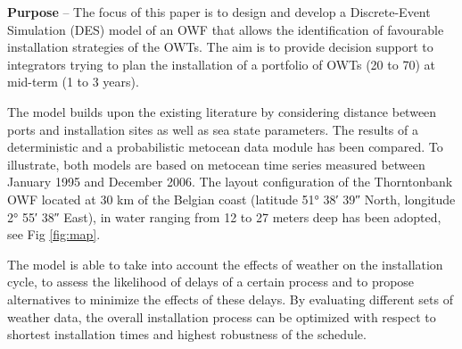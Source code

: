 \textbf{Purpose} --
The focus of this paper is to design and develop a Discrete-Event Simulation (DES) model of an OWF that allows the identification of favourable installation strategies of the OWTs. The aim is to provide decision support to integrators trying to plan the installation of a portfolio of OWTs (20 to 70) at mid-term (1 to 3 years).


The model builds upon the existing literature by considering distance between ports and installation sites as well as sea state parameters. The results of a deterministic and a probabilistic metocean data module has been compared. To illustrate, both models are based on metocean time series measured between January 1995 and December 2006. The layout configuration of the Thorntonbank OWF located at 30 km of the Belgian coast (latitude 51° 38′ 39″ North, longitude 2° 55′ 38″ East), in water ranging from 12 to 27 meters deep has been adopted, see Fig \ref{fig:map}.

The model is able to take into account the effects of weather on the installation cycle, to assess the likelihood of delays of a certain process and to propose alternatives to minimize the effects of these delays. By evaluating different sets of weather data, the overall installation process can be optimized with respect to shortest installation times and highest robustness of the schedule. %


